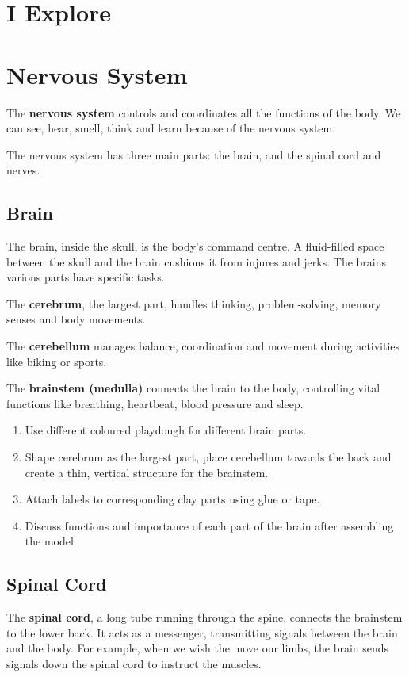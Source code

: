 \section{I Explore}
\section{Nervous System}
The \textbf{nervous system} controls and coordinates all the functions of the body. We can see, hear, smell, think and learn because of the nervous system.
\vspace{0.1in}
\par
The nervous system has three main parts: the brain, and the spinal cord and nerves.
\subsection{Brain}
The brain, inside the skull, is the body's command centre. A fluid-filled space between the skull and the brain cushions it from injures and jerks. The brains various parts have specific tasks.
\vspace{0.1in}
\par
The \textbf{cerebrum}, the largest part, handles thinking, problem-solving, memory senses and body movements.
\vspace{0.1in}
\par
The \textbf{cerebellum} manages balance, coordination and movement during activities like biking or sports.
\vspace{0.1in}
\par
The \textbf{brainstem (medulla)} connects the brain to the body, controlling vital functions like breathing, heartbeat, blood pressure and sleep.
\vspace{1.4in}
\begin{enumerate}
    \item Use different coloured playdough for different brain parts.
    \item Shape cerebrum as the largest part, place cerebellum towards the back and create a thin, vertical structure for the brainstem.
    \item Attach labels to corresponding clay parts using glue or tape.
    \item Discuss functions and importance of each part of the brain after assembling the model.
\end{enumerate}
\vspace{1.6in}
\subsection{Spinal Cord}
The \textbf{spinal cord}, a long tube running through the spine, connects the brainstem to the lower back. It acts as a messenger, transmitting signals between the brain and the body. For example, when we wish the move our limbs, the brain sends signals down the spinal cord to instruct the muscles.
